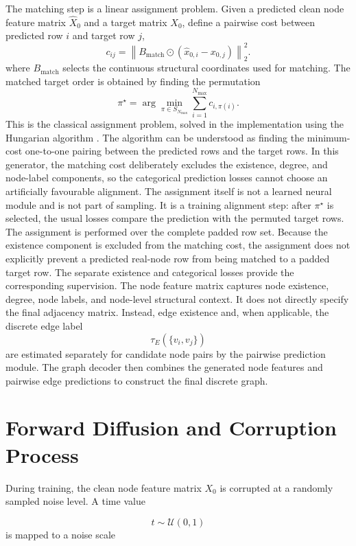 The matching step is a linear assignment problem. Given a predicted clean node
feature matrix \(\hat X_0\) and a target matrix \(X_0\), define a pairwise cost
between predicted row \(i\) and target row \(j\),
\[
c_{ij}
=
\left\|
B_{\mathrm{match}}
\odot
(\hat{x}_{0,i}-x_{0,j})
\right\|_2^2.
\]
where \(B_{\mathrm{match}}\) selects the continuous structural coordinates used
for matching. The matched target order is obtained by finding the permutation
\[
    \pi^\star
    =
    \arg\min_{\pi\in S_{N_{\max}}}
    \sum_{i=1}^{N_{\max}} c_{i,\pi(i)} .
\]
This is the classical assignment problem, solved in the implementation using
the Hungarian algorithm \citep{kuhn1955hungarian,munkres1957algorithms}. The
algorithm can be understood as finding the minimum-cost one-to-one pairing
between the predicted rows and the target rows. In this generator, the matching
cost deliberately excludes the existence, degree, and node-label components, so
the categorical prediction losses cannot choose an artificially favourable
alignment. The assignment itself is not a learned neural module and is not part
of sampling. It is a training alignment step: after \(\pi^\star\) is selected,
the usual losses compare the prediction with the permuted target rows.
The assignment is performed over the complete padded row set. Because the
existence component is excluded from the matching cost, the assignment does
not explicitly prevent a predicted real-node row from being matched to a
padded target row. The separate existence and categorical losses provide the
corresponding supervision.
The node feature matrix captures node existence, degree, node labels, and
node-level structural context. It does not directly specify the final adjacency
matrix.
Instead, edge existence and, when applicable, the discrete edge label
\[
    \tau_E(\{v_i,v_j\})
\]
are estimated separately for candidate node pairs by the pairwise prediction
module. The graph decoder then combines the generated node features and
pairwise edge predictions to construct the final discrete graph.

\section{Forward Diffusion and Corruption Process}
\label{sec:generator:forward}

During training, the clean node feature matrix \(X_0\) is corrupted at a
randomly sampled noise level. A time value

\[
    t \sim \mathcal{U}(0,1)
\]
is mapped to a noise scale

